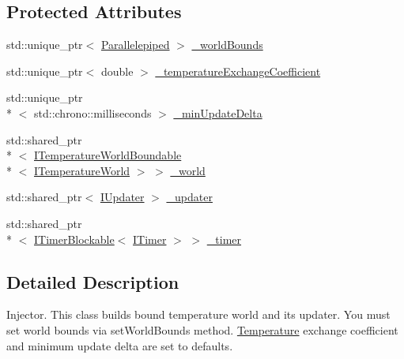 \subsection*{Protected Attributes}
\begin{DoxyCompactItemize}
\item 
std\-::unique\-\_\-ptr$<$ \hyperlink{struct_parallelepiped}{Parallelepiped} $>$ \hyperlink{class_bound_temperature_world_injector_a99e1aa88a9e38bddb58c22b030a126c3}{\-\_\-world\-Bounds}
\item 
std\-::unique\-\_\-ptr$<$ double $>$ \hyperlink{class_bound_temperature_world_injector_ab9a509b3b413ac1ac3825413c8d5d61f}{\-\_\-temperature\-Exchange\-Coefficient}
\item 
std\-::unique\-\_\-ptr\\*
$<$ std\-::chrono\-::milliseconds $>$ \hyperlink{class_bound_temperature_world_injector_a30845955fe87ca6cb33993e98b222aa4}{\-\_\-min\-Update\-Delta}
\item 
std\-::shared\-\_\-ptr\\*
$<$ \hyperlink{class_i_temperature_world_boundable}{I\-Temperature\-World\-Boundable}\\*
$<$ \hyperlink{class_i_temperature_world}{I\-Temperature\-World} $>$ $>$ \hyperlink{class_bound_temperature_world_injector_a5917901f6697587dd6dd05b3f1fd0549}{\-\_\-world}
\item 
std\-::shared\-\_\-ptr$<$ \hyperlink{class_i_updater}{I\-Updater} $>$ \hyperlink{class_bound_temperature_world_injector_a1e6c06b5c8ecafe011f27fa69072751e}{\-\_\-updater}
\item 
std\-::shared\-\_\-ptr\\*
$<$ \hyperlink{class_i_timer_blockable}{I\-Timer\-Blockable}$<$ \hyperlink{class_i_timer}{I\-Timer} $>$ $>$ \hyperlink{class_bound_temperature_world_injector_aabf0e33720ede845f154e57f7cd7edfb}{\-\_\-timer}
\end{DoxyCompactItemize}


\subsection{Detailed Description}
Injector. This class builds bound temperature world and its updater. You must set world bounds via {\ttfamily set\-World\-Bounds} method. \hyperlink{struct_temperature}{Temperature} exchange coefficient and minimum update delta are set to defaults. 

